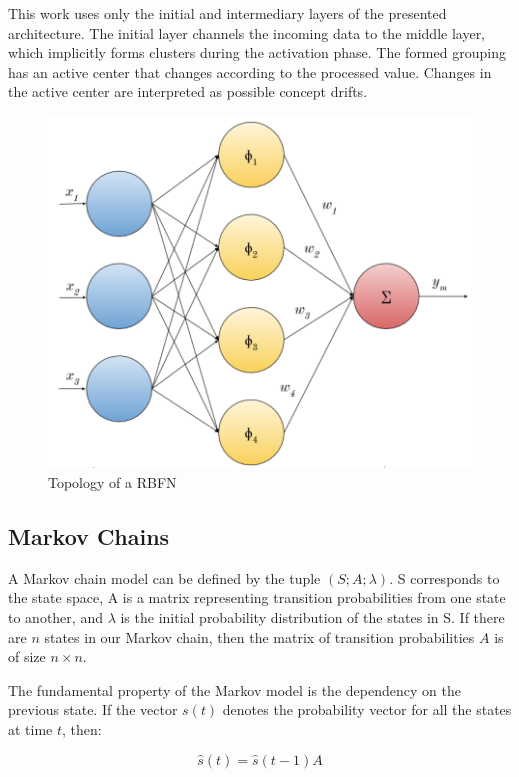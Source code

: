\documentclass[preprint,12pt]{elsarticle}
\begin{document}
This work uses only the initial and intermediary layers of the presented architecture.
The initial layer channels the incoming data to the middle layer, which implicitly forms clusters during the activation phase.
The formed grouping has an active center that changes according to the processed value.
Changes in the active center are interpreted as possible concept drifts.

\begin{figure}[h!]
\begin{center}
    \includegraphics[scale=0.75]{img/rbf_arq.png}
    \caption{Topology of a RBFN}
    \label{fig:rbg_arq}
\end{center}
\end{figure}


\subsection{Markov Chains}

A Markov chain model can be defined by the tuple $(S; A; \lambda)$. S corresponds to the state space, A is a matrix representing transition probabilities from one state to another, and $\lambda$ is the initial probability distribution of the states in S. If there are $n$ states in our Markov chain, then the
matrix of transition probabilities $A$ is of size $n \times n$.

The fundamental property of the Markov model is the dependency on the previous state. If the vector $s(t)$ denotes the probability vector for all the states at time $t$, then:

\begin{equation}
    \label{eq:markov}
    \hat { s } ( t ) = \hat { s } ( t - 1 ) A
\end{equation}
\end{document}
